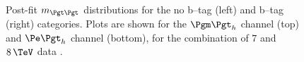 \begin{figure}[tbh]

\caption[Post-fit $m_{\Pgt\Pgt}$ distributions for the no b--tag
(left) and b--tag (right) categories.]{Post-fit $m_{\Pgt\Pgt}$ distributions for the no b--tag
(left) and b--tag (right) categories. Plots are shown for
the $\mutau$ channel (top) and $\etau$ channel (bottom), for the combination of
$7$ and $8\,\TeV$ data \cite{HIG-13-021}.}
\label{fig:mssmpostfitmass}
\end{figure}

